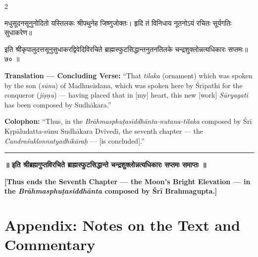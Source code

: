 \documentclass[11pt,a4paper]{article}
\newcommand{\dev}[1]{{\devanagarifont #1}}
\newenvironment{sanskritverse}{%
  \begin{center}\begin{minipage}{0.95\textwidth}
  \setlength{\leftskip}{1em}
  \setlength{\rightskip}{1em}
  \dev
}{\end{minipage}\end{center}}
\begin{document}
\begin{paracol}{2}

\begin{sanskritverse}
मधुसूदनसूनुनोदितो यस्तिलकः श्रीपथुनेह जिष्णुजोक्तः।
हृदि तं विनिधाय नूतनोऽयं रचितः सूर्यगतिः सुधाकरेण॥
\end{sanskritverse}

\begin{sanskritverse}
इति श्रीकृपालुदत्तसूनुसुधाकरद्विवेदिविरचिते ब्राह्मस्फुटसिद्धान्तनुतनतिलके
चन्द्रशुक्लोन्नत्यधिकारः सप्तमः॥ ७० ॥
\end{sanskritverse}

\switchcolumn

\textbf{Translation — Concluding Verse:} ``That \textit{tilaka} (ornament) which was spoken by the son (\textit{sūnu}) of Madhusūdana, which was spoken here by Śrīpathi for the conqueror (\textit{jiṣṇu}) --- having placed that in [my] heart, this new [work] \textit{Sūryagati} has been composed by Sudhākara.''

\textbf{Colophon:} ``Thus, in the \textit{Brāhmasphuṭasiddhānta-nutana-tilaka} composed by Śrī Kṛpāludatta-sūnu Sudhākara Dvivedī, the seventh chapter --- the \textit{Candraśuklonnatyadhikāraḥ} --- [is concluded].''

\end{paracol}

\begin{center}
\textcolor{rulecolor}{\rule{0.8\textwidth}{0.5pt}}
\end{center}

\noindent\textbf{\dev{॥ इति श्रीब्रह्मगुप्तविरचिते ब्राह्मस्फुटसिद्धान्ते चन्द्रशुक्लोन्नत्यधिकारः सप्तमः समाप्तः ॥}}

\noindent\textbf{[Thus ends the Seventh Chapter --- the Moon's Bright Elevation --- in the \textit{Brāhmasphuṭasiddhānta} composed by Śrī Brahmagupta.]}

\vspace{2cm}

\newpage
\section*{Appendix: Notes on the Text and Commentary}
\end{document}
